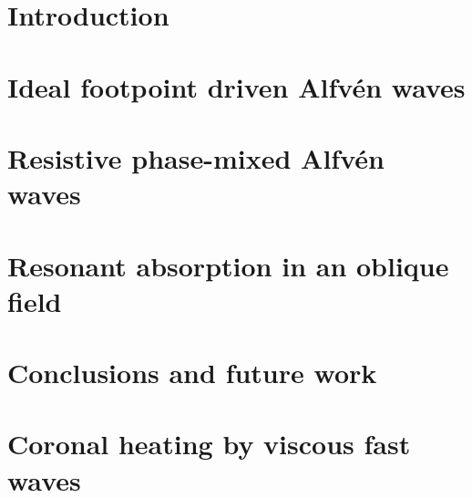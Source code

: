 \documentclass[12pt,fleqn]{report}
\numberwithin{equation}{section}
\begin{document}
\onehalfspacing





 
 
 
\tableofcontents

\chapter{Introduction}
\label{chap:introduction}


\chapter{Ideal footpoint driven Alfv\'en waves}
\label{chap:ideal_footpoint_driven_alfven_waves}


\chapter{Resistive phase-mixed Alfv\'en waves}
\label{chap:resistive_phase_mixed_alfven_waves}

 
\chapter{Resonant absorption in an oblique field}
\label{chap:resonant_absorption_in_an_oblique_field}

 
\chapter{Conclusions and future work}
\label{chap:conclusions_and_future_work}


\appendix
\chapter{Coronal heating by viscous fast waves}
\label{adx:coronal_heating_by_viscous_fast_waves}




\end{document}
